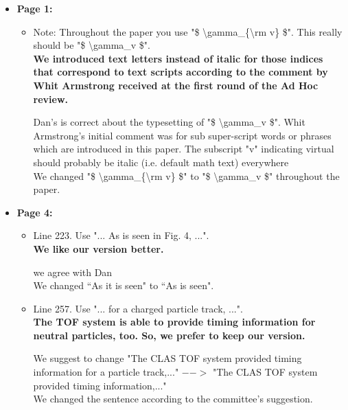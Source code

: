 \documentclass[superscriptaddress,showpacs,amssymb,amsmath,amsfonts,linenumbers,article]{revtex4-1}
\begin{document}
\begin{itemize}
\item {\bf \large Page 1:}
\begin{itemize} 


\item Note: Throughout the paper you use "\$ \textbackslash gamma\_\{\textbackslash rm v\} \$". This really should   be "\$ \textbackslash gamma\_v \$".\\
{\bf We introduced text letters instead of italic for those indices that correspond to text scripts according to the comment by Whit Armstrong received at the first round of the Ad Hoc review.}

\vspace{1em}

{\color{red} Dan's is correct about the typesetting of "\$ \textbackslash gamma\_v \$". Whit Armstrong's initial comment was for sub\/ super-script words or phrases which are introduced in this paper. The subscript "v" indicating virtual should probably be italic (i.e. default math text) everywhere}\\ 
{\color{blue} We changed "\$ \textbackslash gamma\_\{\textbackslash rm v\} \$" to "\$ \textbackslash gamma\_v \$" throughout the paper. }

\end{itemize}



\item {\bf \large  Page 4:}

\begin{itemize} 


\item Line 223. Use "... As is seen in Fig. 4, ...".\\
{\bf We like our version better.}

\vspace{1em}

{\color{red} we agree with Dan}\\ 
{\color{blue} We changed ``As it is seen" to ``As is seen".\\[0.5em]}

\item Line 257. Use "... for a charged particle track, ...".\\
{\bf The TOF system is able to provide timing information for neutral particles, too. So, we prefer to keep our version.}

\vspace{1em}

{\color{red} We suggest to change
"The CLAS TOF system provided timing information for a particle track,..." $-->$ "The CLAS TOF system provided timing information,..."}\\ 
{\color{blue} We changed the sentence according to the committee's suggestion.} 


\end{itemize}
\end{itemize}
\end{document}

